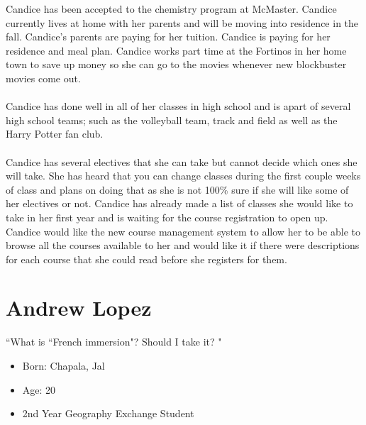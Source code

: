 \documentclass[12pt]{article}
\begin{document}
Candice has been accepted to the chemistry program at McMaster. Candice currently lives at home with her parents and will be moving into residence in the fall. Candice's parents are paying for her tuition. Candice is paying for her residence and meal plan. Candice works part time at the Fortinos in her home town to save up money so she can go to the movies whenever new blockbuster movies come out.\\ \\
Candice has done well in all of her classes in high school and is apart of several high school teams; such as the volleyball team, track and field as well as the Harry Potter fan club.\\  \\
Candice has several electives that she can take but cannot decide which ones she will take. She has heard that you can change classes during the first couple weeks of class and plans on doing that as she is not 100\% sure if she will like some of her electives or not. Candice has already made a list of classes she would like to take in her first year and is waiting for the course registration to open up. Candice would like the new course management system to allow her to be able to browse all the courses available to her and would like it if there were descriptions for each course that she could read before she registers for them.


\newpage

\section{Andrew Lopez}
\begin{minipage}{0.5\textwidth}
\begin{center}
``What is  ``French immersion"? Should I take it? "
\end{center}
\end{minipage}\hfill
\begin{minipage}{0.45\textwidth}
\begin{itemize}
\item Born: Chapala, Jal
\item Age: 20
\item 2nd Year Geography Exchange Student
\end{itemize}
\end{minipage}\\ \\ \\
\end{document}
